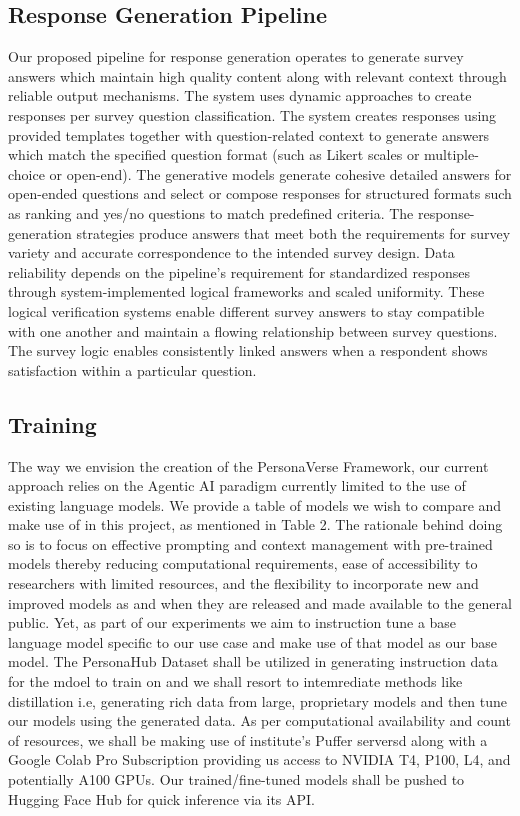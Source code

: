 \documentclass[11pt]{article}
\begin{document}
\subsection{Response Generation Pipeline}

Our proposed pipeline for response generation operates to generate survey answers which maintain high quality content along with relevant context through reliable output mechanisms.
The system uses dynamic approaches to create responses per survey question classification. The system creates responses using provided templates together with question-related context to generate answers which match the specified question format (such as Likert scales or multiple-choice or open-end). The generative models generate cohesive detailed answers for open-ended questions and select or compose responses for structured formats such as ranking and yes/no questions to match predefined criteria. The response-generation strategies produce answers that meet both the requirements for survey variety and accurate correspondence to the intended survey design.
Data reliability depends on the pipeline's requirement for standardized responses through system-implemented logical frameworks and scaled uniformity. These logical verification systems enable different survey answers to stay compatible with one another and maintain a flowing relationship between survey questions. The survey logic enables consistently linked answers when a respondent shows satisfaction within a particular question. 

\subsection{Training}

The way we envision the creation of the PersonaVerse Framework, our current approach relies on the Agentic AI paradigm currently limited to the use of existing language models.  We provide a table of models we wish to compare and make use of in this project, as mentioned in Table 2.
The rationale behind doing so is to focus on effective prompting and context management with pre-trained models thereby reducing computational requirements, ease of accessibility to researchers with limited resources, and the flexibility to incorporate new and improved models as and when they are released and made available to the general public.
Yet, as part of our experiments we aim to instruction tune a base language model specific to our use case and make use of that model as our base model. The PersonaHub Dataset shall be utilized in generating instruction data for the mdoel to train on and we shall resort to intemrediate methods like distillation i.e, generating rich data from large, proprietary models and then tune our models using the generated data. 
As per computational availability and count of resources, we shall be making use of institute's Puffer serversd along with a Google Colab Pro Subscription providing us access to NVIDIA T4, P100, L4, and potentially A100 GPUs. Our trained/fine-tuned models shall be pushed to Hugging Face Hub for quick inference via its API.
\end{document}
